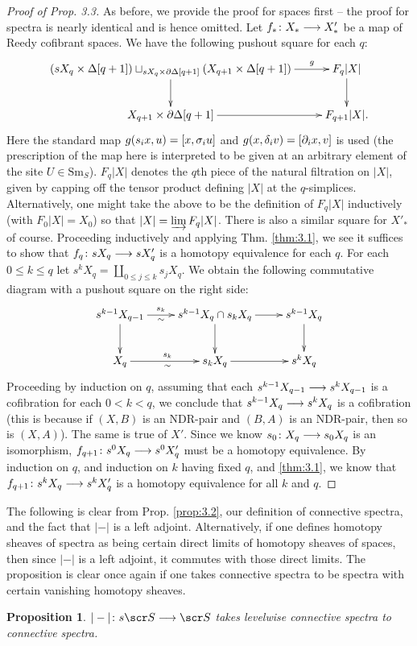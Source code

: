 \documentclass{amsart}
\newtheorem{prop}{Proposition}[section]
\theoremstyle{definition}
\begin{document}
\begin{proof}[Proof of Prop. 3.3] As before, we provide the proof for spaces first -- the proof for spectra is nearly identical and is hence omitted. Let $f_* \colon X_* \longrightarrow X'_*$ be a map of Reedy cofibrant spaces. We have the following pushout square for each $q$:
\[
\xymatrix{
(sX_q \times \DE[q+1]) \sqcup_{sX_q \times \pa \DE[q+1]} (X_{q+1} \times \DE[q+1]) \ar[r]^-g \ar[d] & F_q|X| \ar[d]\\
X_{q+1} \times \pa \DE[q+1] \ar[r] & F_{q+1}|X|.
}
\]
\noindent Here the standard map $g(s_i x, u) = [x,\sigma_i u]$ and $g(x,\delta_i v) = [\partial_i x, v]$ is used (the prescription of the map here is interpreted to be given at an arbitrary element of the site $U \in \mathrm{Sm}_S$). $F_q|X|$ denotes the $q$th piece of the natural filtration on $|X|$, given by capping off the tensor product defining $|X|$ at the $q$-simplices. Alternatively, one might take the above to be the definition of $F_q|X|$ inductively (with $F_0|X|=X_0$) so that $|X| = \varinjlim F_q |X|$. There is also a similar square for $X'_*$ of course. Proceeding inductively and applying Thm. \ref{thm:3.1}, we see it suffices to show that $f_q \colon sX_q \longrightarrow sX'_q$ is a homotopy equivalence for each $q$. For each $0 \leq k \leq q$ let $s^k X_q = \coprod_{0 \leq j \leq k} s_j X_q$. We obtain the following commutative diagram with a pushout square on the right side: \[\xymatrix{
s^{k-1} X_{q-1} \ar[d] \ar[r]^-{s_k}_-{\sim} & s^{k-1}X_{q} \cap s_k X_q \ar[r] \ar[d] & s^{k-1}X_q \ar[d]\\
X_q \ar[r]^{s_k}_{\sim} & s_k X_q \ar[r] & s^k X_q
}\]
\noindent Proceeding by induction on $q$, assuming that each $s^{k-1}X_{q-1} \longrightarrow s^{k}X_{q-1}$ is a cofibration for each $0 < k < q$, we conclude that $s^{k-1}X_q \longrightarrow s^{k}X_q$ is a cofibration (this is because if $(X,B)$ is an NDR-pair and $(B,A)$ is an NDR-pair, then so is $(X,A)$). The same is true of $X'$. Since we know $s_0 \colon X_q \longrightarrow s_0 X_q$ is an isomorphism, $f_{q+1} \colon s^0 X_q \longrightarrow s^0 X'_q$ must be a homotopy equivalence. By induction on $q$, and induction on $k$ having fixed $q$, and \ref{thm:3.1}, we know that $f_{q+1} \colon s^k X_q \longrightarrow s^k X'_q$ is a homotopy equivalence for all $k$ and $q$. 
\end{proof}

The following is clear from Prop. \ref{prop:3.2}, our definition of connective spectra, and the fact that $|-|$ is a left adjoint. Alternatively, if one defines homotopy sheaves of spectra as being certain direct limits of homotopy sheaves of spaces, then since $|-|$ is a left adjoint, it commutes with those direct limits. The proposition is clear once again if one takes connective spectra to be spectra with certain vanishing homotopy sheaves. 
\begin{prop}
$|-| \colon s\sS \rtarr \sS$ takes levelwise connective spectra to connective spectra.
\end{prop}
\end{document}
